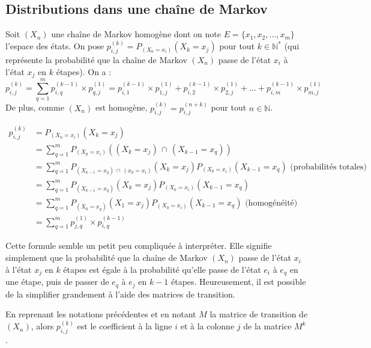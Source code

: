 	\subsection{Distributions dans une chaîne de Markov}

	\begin{formula}[Proposition]
		Soit $(X_n)$ une chaîne de Markov homogène dont on note $E = \{x_1, x_2, \dots, x_m\}$ l'espace des états. On pose $p_{i,j}^{(k)} = P_{(X_0 = x_i)}(X_k = x_j)$ pour tout $k \in \mathbb{N}^*$ (qui représente la probabilité que la chaîne de Markov $(X_n)$ passe de l'état $x_i$ à l'état $x_j$ en $k$ étapes). On a :
		\[ p_{i,j}^{(k)} = \sum_{q=1}^m p_{i,q}^{(k-1)} \times p_{q,j}^{(1)} = p_{i,1}^{(k-1)} \times p_{1,j}^{(1)} + p_{i,2}^{(k-1)} \times p_{2,j}^{(1)} + \dots + p_{i,m}^{(k-1)} \times p_{m,j}^{(1)} \]
		De plus, comme $(X_n)$ est homogène, $p_{i,j}^{(k)} = p_{i,j}^{(n+k)}$ pour tout $n \in \mathbb{N}$.
	\end{formula}

	\begin{demonstration}[Proposition]
		\entretitreetliste
		\begin{align*}
			p_{i,j}^{(k)} &= P_{(X_0 = x_i)}(X_k = x_j) \\
			&= \sum_{q=1}^m P_{(X_0 = x_i)}((X_k = x_j) \, \cap \, (X_{k-1} = x_q)) \\
			&= \sum_{q=1}^m P_{(X_{k-1} = x_q) \, \cap \, (x_0 = x_i)}(X_k = x_j) P_{(X_0 = x_i)}(X_{k-1} = x_q) \text{ (probabilités totales)} \\
			&= \sum_{q=1}^m P_{(X_{k-1} = x_q)}(X_k = x_j) P_{(X_0 = x_i)}(X_{k-1} = x_q) \\
			&= \sum_{q=1}^m P_{(X_0 = x_q)}(X_1 = x_j) P_{(X_0 = x_i)}(X_{k-1} = x_q) \text{ (homogénéité)} \\
			&= \sum_{q=1}^m p_{j,q}^{(1)} \times p_{i,q}^{(k-1)}
		\end{align*}
	\end{demonstration}

	Cette formule semble un petit peu compliquée à interpréter. Elle signifie simplement que la probabilité que la chaîne de Markov $(X_n)$ passe de l'état $x_i$ à l'état $x_j$ en $k$ étapes est égale à la probabilité qu'elle passe de l'état $e_i$ à $e_q$ en une étape, puis de passer de $e_q$ à $e_j$ en $k-1$ étapes. Heureusement, il est possible de la simplifier grandement à l'aide des matrices de transition.

	\begin{formula}
		En reprenant les notations précédentes et en notant $M$ la matrice de transition de $(X_n)$, alors $p_{i,j}^{(k)}$ est le coefficient à la ligne $i$ et à la colonne $j$ de la matrice $M^k$.
	\end{formula}

